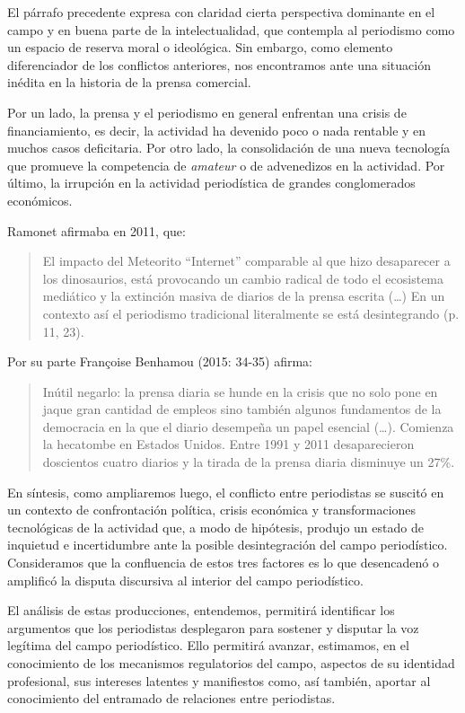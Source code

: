 El párrafo precedente expresa con claridad cierta perspectiva dominante en el campo y en buena parte de la intelectualidad, que contempla al periodismo como un espacio de reserva moral o ideológica. Sin embargo, como elemento diferenciador de los conflictos anteriores, nos encontramos ante una situación inédita en la historia de la prensa comercial.

Por un lado, la prensa y el periodismo en general enfrentan una crisis de financiamiento, es decir, la actividad ha devenido poco o nada rentable y en muchos casos deficitaria. Por otro lado, la consolidación de una nueva tecnología que promueve la competencia de \emph{amateur} o de advenedizos en la actividad. Por último, la irrupción en la actividad periodística de grandes conglomerados económicos.

Ramonet afirmaba en 2011, que:

\begin{quote}
El impacto del Meteorito ``Internet'' comparable al que hizo desaparecer a los dinosaurios, está provocando un cambio radical de todo el ecosistema mediático y la extinción masiva de diarios de la prensa escrita (\ldots) En un contexto así el periodismo tradicional literalmente se está desintegrando (p. 11, 23).
\end{quote}

Por su parte Françoise Benhamou (2015: 34-35) afirma:

\begin{quote}
Inútil negarlo: la prensa diaria se hunde en la crisis que no solo pone en jaque gran cantidad de empleos sino también algunos fundamentos de la democracia en la que el diario desempeña un papel esencial (\ldots). Comienza la hecatombe en Estados Unidos. Entre 1991 y 2011 desaparecieron doscientos cuatro diarios y la tirada de la prensa diaria disminuye un 27\%.
\end{quote}

En síntesis, como ampliaremos luego, el conflicto entre periodistas se suscitó en un contexto de confrontación política, crisis económica y transformaciones tecnológicas de la actividad que, a modo de hipótesis, produjo un estado de inquietud e incertidumbre ante la posible desintegración del campo periodístico. Consideramos que la confluencia de estos tres factores es lo que desencadenó o amplificó la disputa discursiva al interior del campo periodístico.

El análisis de estas producciones, entendemos, permitirá identificar los argumentos que los periodistas desplegaron para sostener y disputar la voz legítima del campo periodístico. Ello permitirá avanzar, estimamos, en el conocimiento de los mecanismos regulatorios del campo, aspectos de su identidad profesional, sus intereses latentes y manifiestos como, así también, aportar al conocimiento del entramado de relaciones entre periodistas.

